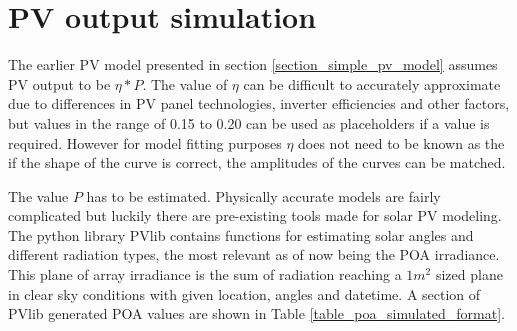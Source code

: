 \chapter{PV output simulation}
The earlier PV model presented in section \ref{section_simple_pv_model} assumes PV output to be $\eta * P$. The value of $\eta$ can be difficult to accurately approximate due to differences in PV panel technologies, inverter efficiencies and other factors, but values in the range of 0.15 to 0.20 can be used as placeholders if a value is required. However for model fitting purposes $\eta$ does not need to be known as the if the shape of the curve is correct, the amplitudes of the curves can be matched.

The value $P$ has to be estimated. Physically accurate models are fairly complicated but luckily there are pre-existing tools made for solar PV modeling. The python library PVlib contains functions for estimating solar angles and different radiation types, the most relevant as of now being the POA irradiance. This plane of array irradiance is the sum of radiation reaching a $1m^2$ sized plane in clear sky conditions with given location, angles and datetime. A section of PVlib generated POA values are shown in Table \ref{table_poa_simulated_format}.















